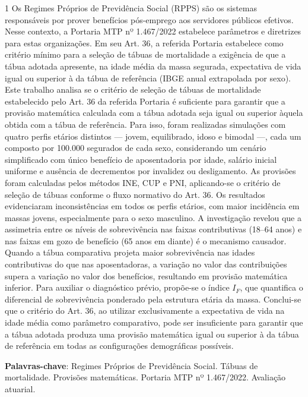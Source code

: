 \begin{spacing}{1}
\noindent Os Regimes Próprios de Previdência Social (RPPS) são os sistemas responsáveis por prover benefícios pós-emprego aos servidores públicos efetivos. Nesse contexto, a Portaria MTP nº 1.467/2022 estabelece parâmetros e diretrizes para estas organizações. Em seu Art. 36, a referida Portaria estabelece como critério mínimo para a seleção de tábuas de mortalidade a exigência de que a tábua adotada apresente, na idade média da massa segurada, expectativa de vida igual ou superior à da tábua de referência (IBGE anual extrapolada por sexo). Este trabalho analisa se o critério de seleção de tábuas de mortalidade estabelecido pelo Art. 36 da referida Portaria é suficiente para garantir que a provisão matemática calculada com a tábua adotada seja igual ou superior àquela obtida com a tábua de referência. Para isso, foram realizadas simulações com quatro perfis etários distintos — jovem, equilibrado, idoso e bimodal —, cada um composto por 100.000 segurados de cada sexo, considerando um cenário simplificado com único benefício de aposentadoria por idade, salário inicial uniforme e ausência de decrementos por invalidez ou desligamento. As provisões foram calculadas pelos métodos INE, CUP e PNI, aplicando-se o critério de seleção de tábuas conforme o fluxo normativo do Art. 36. Os resultados evidenciaram inconsistências em todos os perfis etários, com maior incidência em massas jovens, especialmente para o sexo masculino. A investigação revelou que a assimetria entre os níveis de sobrevivência nas faixas contributivas (18–64 anos) e nas faixas em gozo de benefício (65 anos em diante) é o mecanismo causador. Quando a tábua comparativa projeta maior sobrevivência nas idades contributivas do que nas aposentadoras, a variação no valor das contribuições supera a variação no valor dos benefícios, resultando em provisão matemática inferior. Para auxiliar o diagnóstico prévio, propõe-se o índice $I_F$, que quantifica o diferencial de sobrevivência ponderado pela estrutura etária da massa. Conclui-se que o critério do Art. 36, ao utilizar exclusivamente a expectativa de vida na idade média como parâmetro comparativo, pode ser insuficiente para garantir que a tábua adotada produza uma provisão matemática igual ou superior à da tábua de referência em todas as configurações demográficas possíveis. 
\end{spacing}
\vspace{1.0cm}

\noindent \textbf{Palavras-chave}: Regimes Próprios de Previdência Social. Tábuas de mortalidade. Provisões matemáticas. Portaria MTP nº 1.467/2022. Avaliação atuarial.